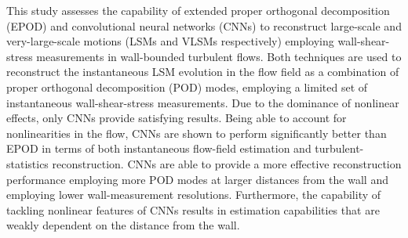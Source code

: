 \begin{paper}

\makepapertitle

%
\begin{paperabstract}
	This study assesses the capability of extended proper orthogonal decomposition (EPOD) and convolutional neural networks (CNNs) to reconstruct large-scale and very-large-scale motions (LSMs and VLSMs respectively) employing wall-shear-stress measurements in wall-bounded turbulent flows.
	Both techniques are used to reconstruct the instantaneous LSM evolution in the flow field as a combination of proper orthogonal decomposition (POD) modes, employing a limited set of instantaneous wall-shear-stress measurements.
	Due to the dominance of nonlinear effects, only CNNs provide satisfying results.
	Being able to account for nonlinearities in the flow, CNNs are shown to perform significantly better than EPOD in terms of both instantaneous flow-field estimation and turbulent-statistics reconstruction.
	CNNs are able to provide a more effective reconstruction performance employing more POD modes at larger distances from the wall and employing lower wall-measurement resolutions.
	Furthermore, the capability of tackling nonlinear features of CNNs results in estimation capabilities that are weakly dependent on the distance from the wall.
\end{paperabstract}


%



%


%

\end{paper}
